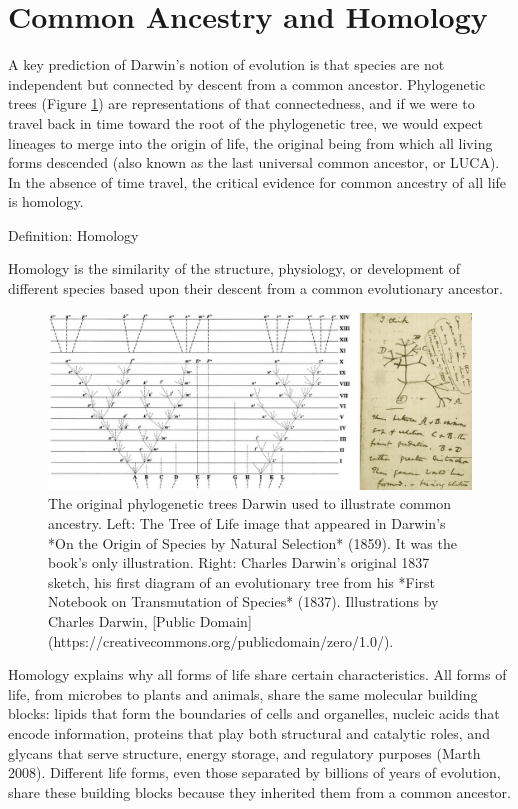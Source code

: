 \documentclass[
]{book}
\begin{document}
\hypertarget{common-ancestry-and-homology}{%
\section{Common Ancestry and Homology}\label{common-ancestry-and-homology}}

A key prediction of Darwin's notion of evolution is that species are not independent but connected by descent from a common ancestor. Phylogenetic trees (Figure \ref{fig:ithink}) are representations of that connectedness, and if we were to travel back in time toward the root of the phylogenetic tree, we would expect lineages to merge into the origin of life, the original being from which all living forms descended (also known as the last universal common ancestor, or LUCA). In the absence of time travel, the critical evidence for common ancestry of all life is homology.

Definition: Homology

Homology is the similarity of the structure, physiology, or development of different species based upon their descent from a common evolutionary ancestor.

\begin{figure}
\includegraphics[width=1\linewidth]{images/I_think} \caption{The original phylogenetic trees Darwin used to illustrate common ancestry. Left: The Tree of Life image that appeared in Darwin's *On the Origin of Species by Natural Selection* (1859). It was the book's only illustration. Right: Charles Darwin's original 1837 sketch, his first diagram of an evolutionary tree from his *First Notebook on Transmutation of Species* (1837). Illustrations by Charles Darwin, [Public Domain](https://creativecommons.org/publicdomain/zero/1.0/).}\label{fig:ithink}
\end{figure}

Homology explains why all forms of life share certain characteristics. All forms of life, from microbes to plants and animals, share the same molecular building blocks: lipids that form the boundaries of cells and organelles, nucleic acids that encode information, proteins that play both structural and catalytic roles, and glycans that serve structure, energy storage, and regulatory purposes (Marth 2008). Different life forms, even those separated by billions of years of evolution, share these building blocks because they inherited them from a common ancestor.
\end{document}
